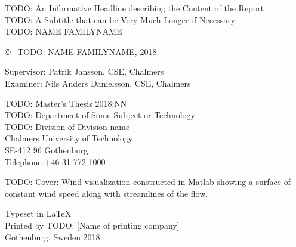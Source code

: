 \newpage
\thispagestyle{plain}
\vspace*{4.5cm}
TODO: An Informative Headline describing the Content of the Report\\
TODO: A Subtitle that can be Very Much Longer if Necessary\\
TODO: NAME FAMILYNAME \setlength{\parskip}{1cm}

\copyright ~ TODO: NAME FAMILYNAME, 2018. \setlength{\parskip}{1cm}

Supervisor: Patrik Jansson, CSE, Chalmers\\
Examiner: Nils Anders Danielsson, CSE, Chalmers \setlength{\parskip}{1cm}

TODO: Master's Thesis 2018:NN\\	%
TODO: Department of Some Subject or Technology\\
TODO: Division of Division name\\
Chalmers University of Technology\\
SE-412 96 Gothenburg\\
Telephone +46 31 772 1000
\setlength{\parskip}{0.5cm}%

\vfill
TODO: Cover: Wind visualization constructed in Matlab showing a surface of constant wind speed along with streamlines of the flow.
\setlength{\parskip}{0.5cm}%

Typeset in \LaTeX \\
Printed by TODO: [Name of printing company]\\
Gothenburg, Sweden 2018
